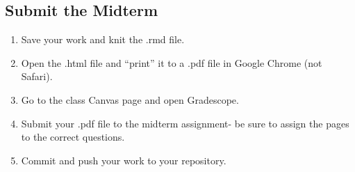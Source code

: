 \documentclass[
]{article}
\providecommand{\tightlist}{%
  \setlength{\itemsep}{0pt}\setlength{\parskip}{0pt}}
\begin{document}
\hfill\break
\hfill\break

\subsection{Submit the Midterm}\label{submit-the-midterm}

\begin{enumerate}
\def\labelenumi{\arabic{enumi}.}
\tightlist
\item
  Save your work and knit the .rmd file.\\
\item
  Open the .html file and ``print'' it to a .pdf file in Google Chrome
  (not Safari).\\
\item
  Go to the class Canvas page and open Gradescope.\\
\item
  Submit your .pdf file to the midterm assignment- be sure to assign the
  pages to the correct questions.\\
\item
  Commit and push your work to your repository.
\end{enumerate}
\end{document}
